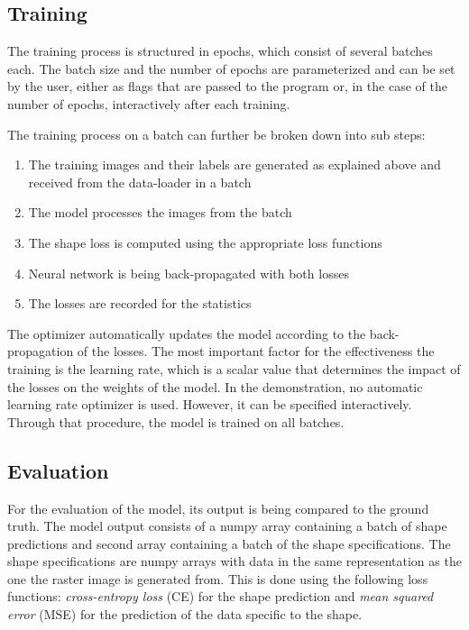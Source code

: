 \documentclass[12pt, a4paper, titlepage]{report}
\begin{document}
\subsection{Training}

The training process is structured in epochs, which consist of several batches each. The batch size and the number of epochs are parameterized and can be set by the user, either as flags that are passed to the program or, in the case of the number of epochs, interactively after each training.

The training process on a batch can further be broken down into sub steps:

\begin{enumerate}[label=\Roman*.]
   \item The training images and their labels are generated as explained above and received from the data-loader in a batch
   \item The model processes the images from the batch
   \item The shape loss is computed using the appropriate loss functions
   \item Neural network is being back-propagated with both losses
   \item The losses are recorded for the statistics
\end{enumerate}

The optimizer automatically updates the model according to the back-propagation of the losses. The most important factor for the effectiveness the training is the learning rate, which is a scalar value that determines the impact of the losses on the weights of the model. In the demonstration, no automatic learning rate optimizer is used. However, it can be specified interactively. Through that procedure, the model is trained on all batches.

\subsection{Evaluation}

For the evaluation of the model, its output is being compared to the ground truth. The model output consists of a numpy array containing a batch of shape predictions and second array containing a batch of the shape specifications. The shape specifications are numpy arrays with data in the same representation as the one the raster image is generated from.
This is done using the following loss functions: \emph{cross-entropy loss} (CE) for the shape prediction and \emph{mean squared error} (MSE) for the prediction of the data specific to the shape.
\end{document}

